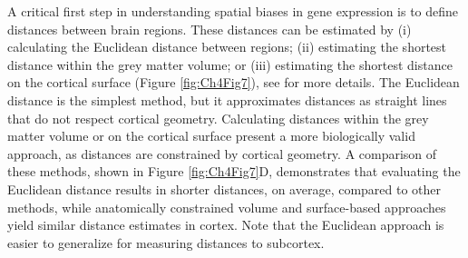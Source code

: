 \documentclass[10pt,A4]{article}
\begin{document}
A critical first step in understanding spatial biases in gene expression is to define distances between brain regions. These distances can be estimated by (i) calculating the Euclidean distance between regions; (ii) estimating the shortest distance within the grey matter volume; or (iii) estimating the shortest distance on the cortical surface (Figure \ref{fig:Ch4Fig7}), see  for more details. The Euclidean distance is the simplest method, but it approximates distances as straight lines that do not respect cortical geometry. Calculating distances within the grey matter volume or on the cortical surface present a more biologically valid approach, as distances are constrained by cortical geometry. A comparison of these methods, shown in Figure \ref{fig:Ch4Fig7}D, demonstrates that evaluating the Euclidean distance results in shorter distances, on average, compared to other methods, while anatomically constrained volume and surface-based approaches yield similar distance estimates in cortex. Note that the Euclidean approach is easier to generalize for measuring distances to subcortex.
\end{document}
